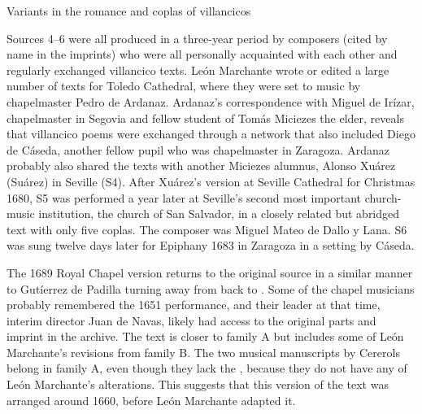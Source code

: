 \begin{table}
    \caption{Variants in the romance and coplas of 
    villancicos} 
    \label{tab:suspended-variants-coplas}
\end{table}

Sources 4--6 were all produced in a three-year period by composers (cited by
name in the imprints) who were all personally acquainted with each other and
regularly exchanged villancico texts.
León Marchante wrote or edited a large number of texts for Toledo Cathedral,
where they were set to music by chapelmaster Pedro de Ardanaz.
Ardanaz's correspondence with Miguel de Irízar, chapelmaster in Segovia and
fellow student of Tomás Miciezes the elder, reveals that villancico poems were
exchanged through a network that also included Diego de Cáseda, another fellow
pupil who was chapelmaster in Zaragoza.%
    \Autocites
    {Rodriguez:Networks}
    [302--311]{Cashner:PhD}
Ardanaz probably also shared the texts with another Miciezes alumnus, Alonso
Xuárez (Suárez) in Seville (S4).
After Xuárez's version at Seville Cathedral for Christmas 1680, S5 was performed
a year later at Seville's second most important church-music institution, the
church of San Salvador, in a closely related but abridged text with only five
coplas.
The composer was Miguel Mateo de Dallo y Lana.
S6 was sung twelve days later for Epiphany 1683 in Zaragoza in a setting by
Cáseda.



The 1689 Royal Chapel version returns to the original source in a similar manner
to Gutíerrez de Padilla turning away from  back to
.
Some of the chapel musicians probably remembered the 1651 performance, and
their leader at that time, interim director Juan de Navas, likely had access to
the original parts and imprint in the archive.%
    \Autocite[]{DMEH} 
The text is closer to family A but includes some of León Marchante's
revisions from family B.
The two musical manuscripts by Cererols belong in family A, even though they
lack the , because they do not have any of León Marchante's
alterations.
This suggests that this version of the text was arranged around 1660, before
León Marchante adapted it.

